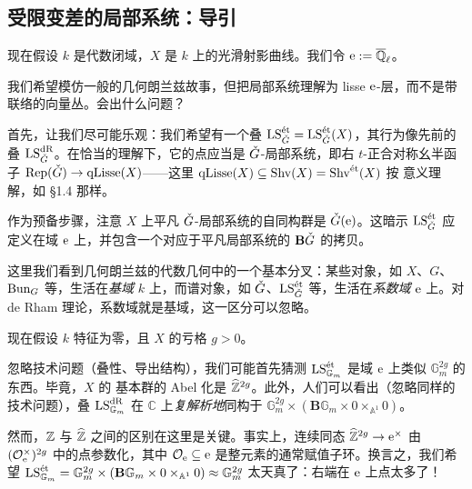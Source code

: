 \subsection{受限变差的局部系统：导引}

 现在假设 $k$ 是代数闭域，$X$ 是 $k$ 上的光滑射影曲线。我们令 $\e := \overline{\Q}_\ell$。

我们希望模仿一般的几何朗兰兹故事，但把局部系统理解为 lisse \et{} $\e$-层，而不是带联络的向量丛。会出什么问题？

首先，让我们尽可能乐观：我们希望有一个叠 $\LS^{\et}_{\bG} = \LS^{\et}_{\bG}(X)$，其行为像先前的叠 $\LS^{\dR}_{\bG}$。在恰当的理解下，它的点应当是 $\bG$-局部系统，即右 $t$-正合对称幺半函子 $\Rep(\bG) \to \qLisse(X)$——这里 $\qLisse(X) \subseteq \Shv(X) = \Shv^{\et}(X)$ 按 \et{} 意义理解，如 §1.4 那样。

作为预备步骤，注意 $X$ 上平凡 $\bG$-局部系统的自同构群是 $\bG(\e)$。这暗示 $\LS^{\et}_{\bG}$ 应定义在域 $\e$ 上，并包含一个对应于平凡局部系统的 $\mathbf{B}\bG$ 的拷贝。

\begin{remark}
这里我们看到几何朗兰兹的代数几何中的一个基本分叉：某些对象，如 $X$、$G$、$\Bun_G$ 等，生活在\emph{基域} $k$ 上，而谱对象，如 $\bG$、$\LS^{\et}_{\bG}$ 等，生活在\emph{系数域} $\e$ 上。对 de Rham 理论，系数域就是基域，这一区分可以忽略。
\end{remark}

\pnum{}现在假设 $k$ 特征为零，且 $X$ 的亏格 $g > 0$。

忽略技术问题（叠性、导出结构），我们可能首先猜测 $\LS^{\et}_{\mathbb{G}_m}$ 是域 $\e$ 上类似 $\mathbb{G}_m^{2g}$ 的东西。毕竟，$X$ 的 \et{} 基本群的 Abel 化是 $\widehat{\ZZ}^{2g}$。此外，人们可以看出（忽略同样的技术问题），叠 $\LS^{\dR}_{\mathbb{G}_m}$ 在 $\mathbb{C}$ 上\emph{复解析地}同构于 $\mathbb{G}_m^{2g} \times (\mathbf{B}\mathbb{G}_m \times 0 \times_{\mathbb{A}^1} 0)$。

然而，$\ZZ$ 与 $\widehat{\ZZ}$ 之间的区别在这里是关键。事实上，连续同态 $\widehat{\ZZ}^{2g} \to \e^\times$ 由 $(\OO^{\times}_{\e})^{2g}$ 中的点参数化，其中 $\OO_{\e} \subseteq \e$ 是整元素的通常赋值子环。换言之，我们希望 $\LS^{\et}_{\mathbb{G}_m} = \mathbb{G}_m^{2g} \times (\mathbf{B}\mathbb{G}_m \times 0 \times_{\mathbb{A}^1} 0) \approx \mathbb{G}_m^{2g}$ 太天真了：右端在 $\e$ 上点太多了！

